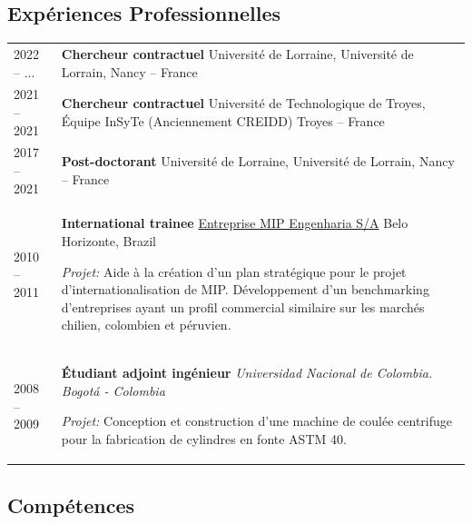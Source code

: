 \documentclass[
  11pt,
]{article}
\begin{document}
\hypertarget{expuxe9riences-professionnelles}{%
\subsection{Expériences
Professionnelles}\label{expuxe9riences-professionnelles}}

\extrarowsep=3pt
\begin{tabu} to \linewidth {X[0.4,l] X[2,l]}
2022 -- ... &
    \textbf{Chercheur contractuel} Université de Lorraine, Université de Lorrain, Nancy -- France \\[5pt]

2021 -- 2021 &
    \textbf{Chercheur contractuel} Université de Technologique de Troyes, Équipe InSyTe (Anciennement CREIDD) Troyes -- France \\[5pt]

2017 -- 2021 &
    \textbf{Post-doctorant} Université de Lorraine, Université de Lorrain, Nancy -- France \\[5pt]

2010 -- 2011 & \textbf{International trainee} \href{http://www.mipengenharia.com.br/}{Entreprise MIP Engenharia S/A} \thinspace Belo Horizonte, Brazil \par
\textit{Projet:} Aide à la création d'un plan stratégique pour le projet d'internationalisation de MIP. Développement d'un benchmarking d'entreprises ayant un profil commercial similaire sur les marchés chilien, colombien et péruvien. \\
    
2008 -- 2009 &
    \textbf{Étudiant adjoint ingénieur} \emph{Universidad Nacional de Colombia. Bogotá - Colombia}  \par 
    \emph{Projet:} Conception et construction d'une machine de coulée centrifuge pour la fabrication de cylindres en fonte ASTM 40. \\
\end{tabu}

\hypertarget{compuxe9tences}{%
\subsection{Compétences}\label{compuxe9tences}}
\end{document}
